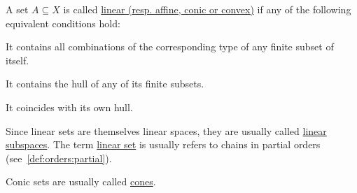 \begin{definition}\label{def:analysis/linear_combination_sets}
  A set $A \subseteq X$ is called \uline{linear (resp. affine, conic or convex)} if any of the following equivalent conditions hold:

  \begin{defenum}
    \item It contains all combinations of the corresponding type of any finite subset of itself.
    \item It contains the hull of any of its finite subsets.
    \item It coincides with its own hull.
  \end{defenum}

  Since linear sets are themselves linear spaces, they are usually called \uline{linear subspaces}. The term \uline{linear set} is usually refers to chains in partial orders (see~\cref{def:orders:partial}).

  Conic sets are usually called \uline{cones}.
\end{definition}

